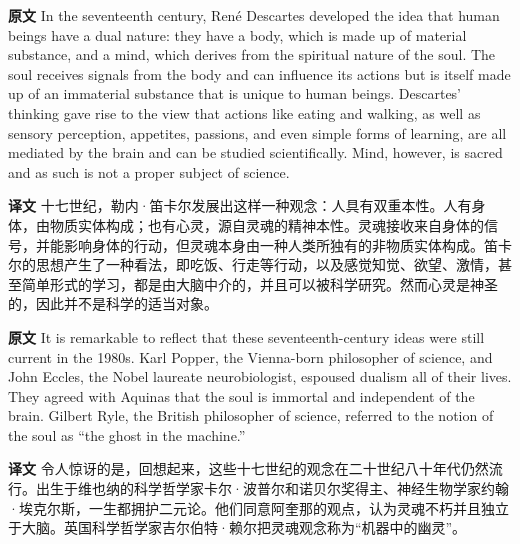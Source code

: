\documentclass[UTF8,zihao=-4]{ctexart}
\newcommand{\BodyFont}{\fontsize{10.5pt}{15.5pt}\selectfont}
\newcommand{\origlabel}{\textbf{原文}\quad}
\newcommand{\translabel}{\textbf{译文}\quad}
\newenvironment{enblock}{\par\noindent\begingroup\BodyFont\origlabel}{\par\endgroup}
\newenvironment{zhblock}{\par\noindent\begingroup\BodyFont\translabel}{\par\endgroup\vspace{0.35em}}
\begin{document}
\begin{enblock}
In the seventeenth century, René Descartes developed the idea that human beings have a dual nature: they have a body, which is made up of material substance, and a mind, which derives from the spiritual nature of the soul. The soul receives signals from the body and can influence its actions but is itself made up of an immaterial substance that is unique to human beings. Descartes' thinking gave rise to the view that actions like eating and walking, as well as sensory perception, appetites, passions, and even simple forms of learning, are all mediated by the brain and can be studied scientifically. Mind, however, is sacred and as such is not a proper subject of science.
\end{enblock}
\begin{zhblock}
十七世纪，勒内·笛卡尔发展出这样一种观念：人具有双重本性。人有身体，由物质实体构成；也有心灵，源自灵魂的精神本性。灵魂接收来自身体的信号，并能影响身体的行动，但灵魂本身由一种人类所独有的非物质实体构成。笛卡尔的思想产生了一种看法，即吃饭、行走等行动，以及感觉知觉、欲望、激情，甚至简单形式的学习，都是由大脑中介的，并且可以被科学研究。然而心灵是神圣的，因此并不是科学的适当对象。\end{zhblock}

\begin{enblock}
It is remarkable to reflect that these seventeenth-century ideas were still current in the 1980s. Karl Popper, the Vienna-born philosopher of science, and John Eccles, the Nobel laureate neurobiologist, espoused dualism all of their lives. They agreed with Aquinas that the soul is immortal and independent of the brain. Gilbert Ryle, the British philosopher of science, referred to the notion of the soul as “the ghost in the machine.”\end{enblock}
\begin{zhblock}
令人惊讶的是，回想起来，这些十七世纪的观念在二十世纪八十年代仍然流行。出生于维也纳的科学哲学家卡尔·波普尔和诺贝尔奖得主、神经生物学家约翰·埃克尔斯，一生都拥护二元论。他们同意阿奎那的观点，认为灵魂不朽并且独立于大脑。英国科学哲学家吉尔伯特·赖尔把灵魂观念称为“机器中的幽灵”。\end{zhblock}
\end{document}
